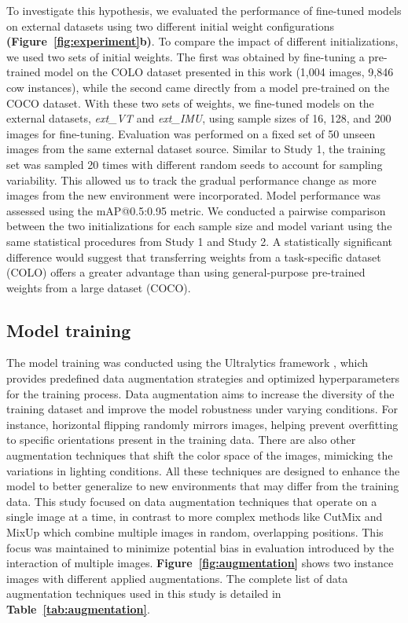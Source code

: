 To investigate this hypothesis, we evaluated the performance of fine-tuned models on external datasets using two different initial weight configurations \textbf{(Figure~\ref{fig:experiment}b)}. To compare the impact of different initializations, we used two sets of initial weights. The first was obtained by fine-tuning a pre-trained model on the COLO dataset presented in this work (1,004 images, 9,846 cow instances), while the second came directly from a model pre-trained on the COCO dataset. With these two sets of weights, we fine-tuned models on the external datasets, \textit{ext\_VT} and \textit{ext\_IMU}, using sample sizes of 16, 128, and 200 images for fine-tuning. Evaluation was performed on a fixed set of 50 unseen images from the same external dataset source. Similar to Study 1, the training set was sampled 20 times with different random seeds to account for sampling variability. This allowed us to track the gradual performance change as more images from the new environment were incorporated. Model performance was assessed using the mAP@0.5:0.95 metric. We conducted a pairwise comparison between the two initializations for each sample size and model variant using the same statistical procedures from Study 1 and Study 2. A statistically significant difference would suggest that transferring weights from a task-specific dataset (COLO) offers a greater advantage than using general-purpose pre-trained weights from a large dataset (COCO).

\subsection*{Model training}

The model training was conducted using the Ultralytics framework \citep{ultralytics_yolo}, which provides predefined data augmentation strategies and optimized hyperparameters for the training process. Data augmentation aims to increase the diversity of the training dataset and improve the model robustness under varying conditions. For instance, horizontal flipping randomly mirrors images, helping prevent overfitting to specific orientations present in the training data. There are also other augmentation techniques that shift the color space of the images, mimicking the variations in lighting conditions. All these techniques are designed to enhance the model to better generalize to new environments that may differ from the training data. This study focused on data augmentation techniques that operate on a single image at a time, in contrast to more complex methods like CutMix \citep{yun_cutmix_2019} and MixUp \citep{zhang_mixup_2018} which combine multiple images in random, overlapping positions. This focus was maintained to minimize potential bias in evaluation introduced by the interaction of multiple images. \textbf{Figure~\ref{fig:augmentation}} shows two instance images with different applied augmentations. The complete list of data augmentation techniques used in this study is detailed in \textbf{Table~\ref{tab:augmentation}}.

